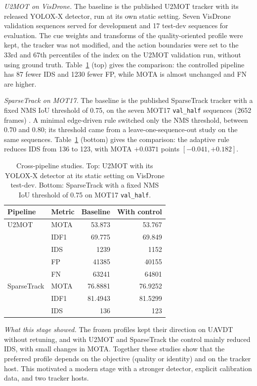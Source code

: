 \documentclass[journal]{new-aiaa}
\begin{document}
\emph{U2MOT on VisDrone.} The baseline is the published U2MOT tracker
\cite{liu2023u2mot} with its released YOLOX-X detector, run
at its own static setting. Seven VisDrone validation sequences served for
development and 17 test-dev sequences for evaluation. The cue weights and
transforms of the quality-oriented profile were kept, the tracker was not
modified, and the action boundaries were set to the 33rd and 67th percentiles
of the index on the U2MOT validation run, without using ground truth.
Table~\ref{tab:u2mot} (top) gives the comparison: the controlled pipeline has 87
fewer IDS and 1230 fewer FP, while MOTA is almost unchanged and FN are higher.


\emph{SparseTrack on MOT17.} The baseline is the published SparseTrack tracker
\cite{liu2025sparsetrack} with a fixed NMS IoU threshold of 0.75, on the seven
MOT17 \texttt{val\_half} sequences (2652 frames) \cite{dendorfer2021motchallenge}.
A minimal edge-driven rule switched only the NMS threshold, between 0.70 and
0.80; its threshold came from a leave-one-sequence-out study on the same
sequences. Table~\ref{tab:u2mot} (bottom) gives the comparison: the adaptive rule
reduces IDS from 136 to 123, with MOTA $+0.0371$ points $[-0.041, +0.182]$.

\begin{table}[htbp]
\caption{Cross-pipeline studies. Top: U2MOT with its YOLOX-X detector at its
static setting on VisDrone test-dev. Bottom: SparseTrack with a fixed NMS IoU
threshold of 0.75 on MOT17 \texttt{val\_half}.}
\label{tab:u2mot}
\centering\footnotesize
\setlength{\tabcolsep}{4pt}
\begin{tabular}{@{}llrr@{}}
\toprule
Pipeline & Metric & Baseline & With control\\
\midrule
U2MOT & MOTA & 53.873 & 53.767\\
 & IDF1 & 69.775 & 69.849\\
 & IDS & 1239 & 1152\\
 & FP & 41385 & 40155\\
 & FN & 63241 & 64801\\
\midrule
SparseTrack & MOTA & 76.8881 & 76.9252\\
 & IDF1 & 81.4943 & 81.5299\\
 & IDS & 136 & 123\\
\bottomrule
\end{tabular}
\end{table}

\emph{What this stage showed.} The frozen profiles kept their direction on
UAVDT without retuning, and with U2MOT and SparseTrack the control mainly
reduced IDS, with small changes in MOTA. Together these
studies show that the preferred profile depends on the objective (quality or
identity) and on the tracker host. This motivated a modern stage with a
stronger detector, explicit calibration data, and two tracker hosts.
\end{document}

